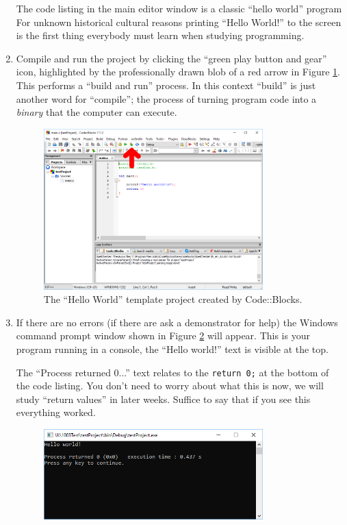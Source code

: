 \documentclass{lab}
\begin{document}
\begin{enumerate}
 The code listing in the main editor window is a classic ``hello world'' program For unknown historical cultural reasons printing ``Hello World!'' to the screen is the first thing everybody must learn when studying programming.

\item Compile and run the project by clicking the ``green play button and gear'' icon, highlighted by the professionally drawn blob of a red arrow in Figure \ref{fig:codeblocksTemplate}. This performs a ``build and run'' process. In this context ``build'' is just another word for ``compile''; the process of turning program code into a \textit{binary} that the computer can execute.

\begin{figure}[H]
\begin{center}
\includegraphics[width=0.8\textwidth]{Wk1Images/cb7}
\end{center}
\caption{The ``Hello World'' template project created by Code::Blocks.}
\label{fig:codeblocksTemplate}
\end{figure}
\pagebreak
\item If there are no errors (if there are ask a demonstrator for help) the Windows command prompt window shown in Figure \ref{fig:cmdcom} will appear. This is your program running in a console, the ``Hello world!'' text is visible at the top.

The ``Process returned 0...'' text relates to the \texttt{return 0;} at the bottom of the code listing. You don't need to worry about what this is now, we will study ``return values'' in later weeks. Suffice to say that if you see this everything worked.

\begin{figure}[H]
\begin{center}
\includegraphics[width=0.8\textwidth]{Wk1Images/cb8}
\end{center}
\caption{}
\label{fig:cmdcom}
\end{figure}

\end{enumerate}
\end{document}
